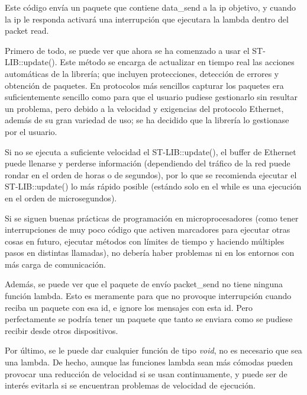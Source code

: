 \documentclass{report}
\begin{document}
Este código envía un paquete que contiene data\_send a la ip objetivo, y cuando la ip le responda activará una interrupción que ejecutara la lambda dentro del packet read. 
\par
Primero de todo, se puede ver que ahora se ha comenzado a usar el ST-LIB::update(). Este método se encarga de actualizar en tiempo real las acciones automáticas de la librería; que incluyen protecciones, detección de errores y obtención de paquetes. En protocolos más sencillos capturar los paquetes era suficientemente sencillo como para que el usuario pudiese gestionarlo sin resultar un problema, pero debido a la velocidad y exigencias del protocolo Ethernet, además de su gran variedad de uso; se ha decidido que la librería lo gestionase por el usuario. 
\par \vspace{0.3cm}
Si no se ejecuta a suficiente velocidad el ST-LIB::update(), el buffer de Ethernet puede llenarse y perderse información (dependiendo del tráfico de la red puede rondar en el orden de horas o de segundos), por lo que se recomienda ejecutar el ST-LIB::update() lo más rápido posible (estándo solo en el while es una ejecución en el orden de microsegundos). 
\par
 Si se siguen buenas prácticas de programación en microprocesadores (como tener interrupciones de muy poco código que activen marcadores para ejecutar otras cosas en futuro, ejecutar métodos con límites de tiempo y haciendo múltiples pasos en distintas llamadas), no debería haber problemas ni en los entornos con más carga de comunicación. 
 \par \vspace{0.3cm}
 Además, se puede ver que el paquete de envío packet\_send no tiene ninguna función lambda. Esto es meramente para que no provoque interrupción cuando reciba un paquete con esa id, e ignore los mensajes con esta id. Pero perfectamente se podría tener un paquete que tanto se enviara como se pudiese recibir desde otros dispositivos. \par
 Por último, se le puede dar cualquier función de tipo \textit{void}, no es necesario que sea una lambda. De hecho, aunque las funciones lambda sean más cómodas pueden provocar una reducción de velocidad si se usan continuamente, y puede ser de interés evitarla si se encuentran problemas de velocidad de ejecución. 
\end{document}
